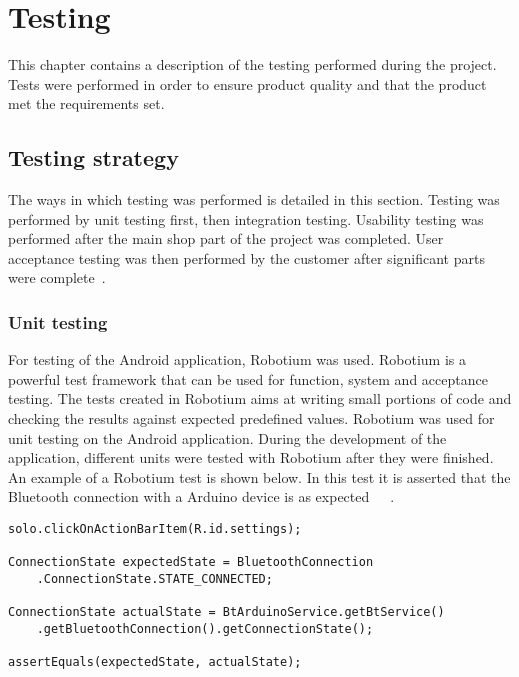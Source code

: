 \chapter{Testing}
	This chapter contains a description of the testing performed during the project. Tests were performed in order to ensure product quality and that the product met the requirements set.
	
	\section{Testing strategy}
		The ways in which testing was performed is detailed in this section. Testing was performed by unit testing first, then integration testing. Usability testing was performed after the main shop part of the project was completed. User acceptance testing was then performed by the customer after significant parts were complete~\cite{testing-overview}.

		\subsection{Unit testing}
			For testing of the Android application, Robotium was used. Robotium is a powerful test framework that can be used for function, system and acceptance testing. The tests created in Robotium aims at writing small portions of code and checking the results against expected predefined values. Robotium was used for unit testing on the Android application. During the development of the application, different units were tested with Robotium after they were finished. An example of a Robotium test is shown below. In this test it is asserted that the Bluetooth connection with a Arduino device is as expected~\cite{unit-testing1}~\cite{unit-testing2}~\cite{unit-testing3}.\\

			\begin{lstlisting}
solo.clickOnActionBarItem(R.id.settings);

ConnectionState expectedState = BluetoothConnection
	.ConnectionState.STATE_CONNECTED;
	
ConnectionState actualState = BtArduinoService.getBtService()
	.getBluetoothConnection().getConnectionState();

assertEquals(expectedState, actualState);
			\end{lstlisting}

